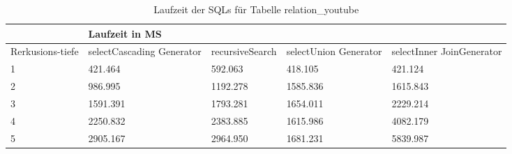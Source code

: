 \begin{table}[H]
	\begin{tabular}{l|l|l|l|l|l|}
		\cline{2-6}
		& \multicolumn{5}{|l|}{Laufzeit in MS}                                                                                                                                                  \\ \hline
		\multicolumn{1}{|l|}{\multirow{2}{2cm}{Rerkusions-tiefe}} & \multicolumn{2}{|l|}{\multirow{2}{3cm}{selectCascading Generator}} & \multirow{2}{2.8cm}{recursiveSearch} & \multirow{2}{2.5cm}{selectUnion Generator} & \multirow{2}{2.5cm}{selectInner JoinGenerator} \\
		\multicolumn{1}{|l|}{}
		& \multicolumn{2}{|l|}{}                                           &                                  &                                     &                                           \\ \hline
		
		\multicolumn{1}{|l|}{1}                                 & \multicolumn{2}{l|}{421.464}                                     & 592.063                                               & 418.105                                                   & 421.124                                                         \\ \hline
		\multicolumn{1}{|l|}{2}                                 & \multicolumn{2}{l|}{986.995}                                     & 1192.278                                              & 1585.836                                                  & 1615.843                                                        \\ \hline
		\multicolumn{1}{|l|}{3}                                 & \multicolumn{2}{l|}{1591.391}                                    & 1793.281                                              & 1654.011                                                  & 2229.214                                                        \\ \hline
		\multicolumn{1}{|l|}{4}                                 & \multicolumn{2}{l|}{2250.832}                                    & 2383.885                                              & 1615.986                                                  & 4082.179                                                        \\ \hline
		\multicolumn{1}{|l|}{5}                                 & \multicolumn{2}{l|}{2905.167}                                    & 2964.950                                              & 1681.231                                                  & 5839.987                                                        \\ \hline
		
		
		
	\end{tabular}
	\caption{Laufzeit der SQLs für Tabelle relation\_youtube}
	\label{2.relationyoutube.table}
\end{table}

